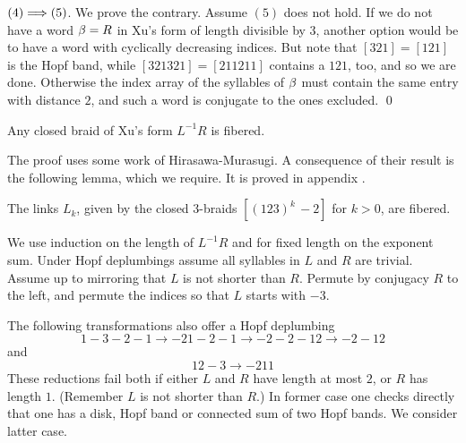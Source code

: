 $(4)\Longrightarrow (5)$. We prove the contrary. Assume $(5)$ does not hold.
If we do not have a word $\beta=R$ in Xu's form of length divisible by
$3$, another option would be to have a word with cyclically decreasing
indices. But note that $[321]=[121]$ is the Hopf band, while
$[321321]=[211211]$ contains a $121$, too, and so we
are done. Otherwise the index array of
the syllables of $\beta$ must contain the same entry with distance $2$,
and such a word is conjugate to the ones excluded.
\qed

\begin{theorem}\label{xLR}
Any closed braid of Xu's form $L^{-1}R$ is fibered.
\end{theorem}

The proof uses some work of Hirasawa-Murasugi.
A consequence of their result is the following lemma,
which we require. It is proved in appendix .

\begin{lemma}\label{lki}
The links $L_k$, given by the closed 3-braids $[(123)^k\,-2]$ for $k>0$,
are fibered.
\end{lemma}

% 
% 


We use induction on the length of $L^{-1}R$ and for fixed
length on the exponent sum. Under Hopf deplumbings assume all
syllables in $L$ and $R$ are trivial.
Assume up to mirroring that $L$ is not shorter than $R$.
Permute by conjugacy $R$ to
the left, and permute the indices so that $L$ starts with $-3$. 

The following transformations also offer a Hopf deplumbing
\[
1-3-2-1\to -2 1 -2 -1\to -2 -2 -1 2\to -2 -1 2
\]
and
\[
1 2 -3\to -2 1 1
\]
These reductions fail both if either $L$ and $R$ have length at most
$2$, or $R$ has length $1$. (Remember $L$ is not shorter than $R$.)
In former case one checks directly that one has a disk, Hopf band or
connected sum of two Hopf bands. We consider latter case.

